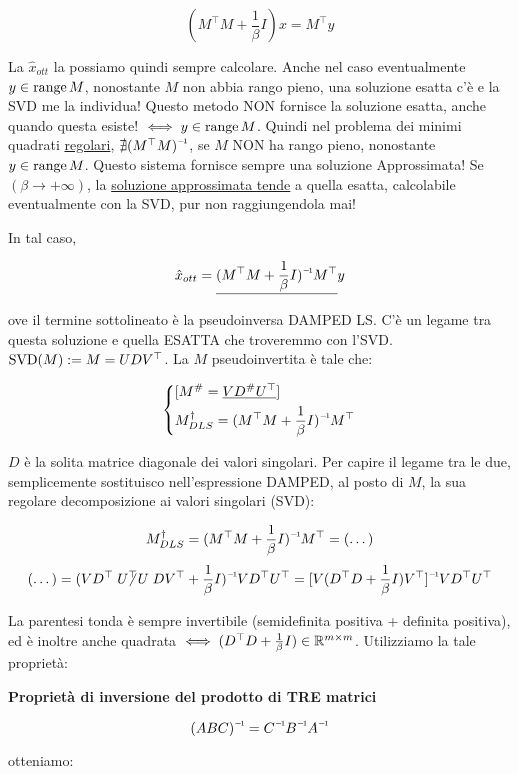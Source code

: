 \[
	(M^\top M + \frac{1}{\beta}I)x = M^\top y
\]

La $\hat{x}_{ott}$ la possiamo quindi sempre calcolare. Anche nel caso eventualmente $y\in\operatorname{range}{M}$, nonostante $M$ non abbia rango pieno, una soluzione esatta c'è e la SVD me la individua! Questo metodo NON fornisce la soluzione esatta, anche quando questa esiste! $\iff y\in\operatorname{range}{M}$. Quindi nel problema dei minimi quadrati \underline{regolari}, $\nexists \inv{(M^\top M)}$, se $M$ NON ha rango pieno, nonostante $y\in\operatorname{range}{M}$. Questo sistema fornisce sempre una soluzione Approssimata! Se $(\beta\to+\infty)$, la \underline{soluzione approssimata tende} a quella esatta, calcolabile eventualmente con la SVD, pur non raggiungendola mai!

In tal caso,

\[
	\hat{x}_{ott} = \underline{\inv{(M^\top M + \frac{1}{\beta}I)}M^\top}y
\]

ove il termine sottolineato è la pseudoinversa DAMPED LS. C'è un legame tra questa soluzione e quella ESATTA che troveremmo con l'SVD. $\operatorname{SVD}(M) := M = UDV^\top$. La $M$ pseudoinvertita è tale che:

\[
	\left\{
	\begin{aligned}
	&[M^\# = \underline{VD^\# U^\top}]\\
	&M^\dag_{DLS} = \inv{(M^\top M + \frac{1}{\beta}I)}M^\top
	\end{aligned}
	\right.
\]

$D$ è la solita matrice diagonale dei valori singolari. Per capire il legame tra le due, semplicemente sostituisco nell'espressione DAMPED, al posto di $M$, la sua regolare decomposizione ai valori singolari (SVD):

\[
	M^\dag_{DLS} = \inv{(M^\top M +\frac{1}{\beta}I)}M^\top = (\dots)
\]
\[
	(\dots) = \inv{(VD^\top\centernot{U^\top U}DV^\top + \frac{1}{\beta}I)}VD^\top U^\top = \inv{[V(D^\top D + \frac{1}{\beta}I)V^\top]}VD^\top U^\top
\]

La parentesi tonda è sempre invertibile (semidefinita positiva + definita positiva), ed è inoltre anche quadrata $\iff (D^\top D + \frac{1}{\beta}I)\in\mathbb{R}^{m\times m}$. Utilizziamo la tale proprietà:

\begin{corl}{\textbf{Proprietà di inversione del prodotto di TRE matrici}}

\[
	\inv{(ABC)} = \inv{C}\inv{B}\inv{A}
\]

\end{corl}

otteniamo:

